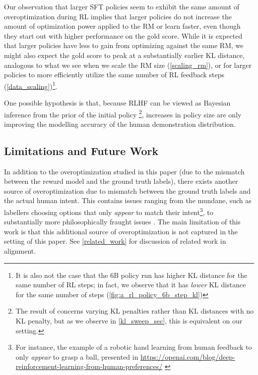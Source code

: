 \documentclass{article}
\theoremstyle{plain}
\begin{document}
Our observation that larger SFT policies seem to exhibit the same amount of overoptimization during RL implies that larger policies do not increase the amount of optimization power applied to the RM or learn faster, even though they start out with higher performance on the gold score. While it is expected that larger policies have less to gain from optimizing against the same RM, we might also expect the gold score to peak at a substantially earlier KL distance, analogous to what we see when we scale the RM size (\cref{scaling_rm}), or for larger policies to more efficiently utilize the same number of RL feedback steps (\cref{data_scaling})\footnote{It is also not the case that the 6B policy run has higher KL distance for the same number of RL steps; in fact, we observe that it has \textit{lower} KL distance for the same number of steps (\cref{fig:a_rl_policy_6b_step_kl})}.

One possible hypothesis is that, because RLHF can be viewed as Bayesian inference from the prior of the initial policy \citep{korbak2022rl}\footnote{The result of \citet{korbak2022rl} concerns varying KL penalties rather than KL distances with no KL penalty, but as we observe in \cref{kl_sweep_sec}, this is equivalent on our setting.}, increases in policy size are only improving the modelling accuracy of the human demonstration distribution.












\subsection{Limitations and Future Work}\label{limitations}

In addition to the overoptimization studied in this paper (due to the mismatch between the reward model and the ground truth labels), there exists another source of overoptimization due to mismatch between the ground truth labels and the actual human intent. This contains issues ranging from the mundane, such as labellers choosing options that only \textit{appear} to match their intent\footnote{For instance, the example of a robotic hand learning from human feedback to only \textit{appear} to grasp a ball, presented in \url{https://openai.com/blog/deep-reinforcement-learning-from-human-preferences/} \citep{christiano2017deep}}, to substantially more philosophically fraught issues \citep{NEURIPS2018_d89a66c7,sunstein2001predictably}. The main limitation of this work is that this additional source of overoptimization is not captured in the setting of this paper. See \cref{related_work} for discussion of related work in alignment.
\end{document}
